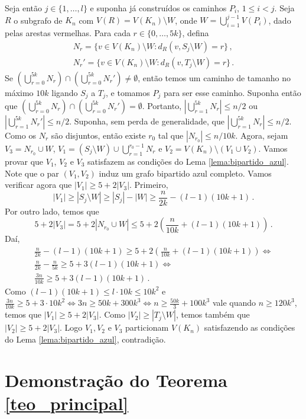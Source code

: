 \begin{dem}
	Seja então $j\in \{1,\dots, l\}$ e suponha já construídos os caminhos $P_i$, $1\leq i<j$. Seja $R$ o subgrafo de $K_n$ com $V(R) = V(K_n)\setminus W$, onde $W = \bigcup_{i=1}^{j-1} V(P_i)$, dado pelas arestas vermelhas. Para cada $r\in\{0,\dots,5k\}$, defina
	\begin{align*}
		N_r = \{v\in V(K_n)\setminus W: d_R(v, S_j\setminus W) = r\} \,,\\
		N_r' = \{v\in V(K_n)\setminus W: d_R(v, T_j\setminus W) = r\}\,.
	\end{align*}
	Se $(\bigcup_{r=0}^{5k}N_r) \cap (\bigcup_{r=0}^{5k}N_r')\neq \emptyset$, então temos um caminho de tamanho no máximo $10k$ ligando $S_j$ a $T_j$, e tomamos $P_j$ para ser esse caminho. Suponha então que $(\bigcup_{r=0}^{5k}N_r)\cap(\bigcup_{r=0}^{5k}N_r') = \emptyset$. Portanto, $|\bigcup_{r=1}^{5k}N_r|\leq n/2$ ou $|\bigcup_{r=1}^{5k}N_r'|\leq n/2$. Suponha, sem perda de generalidade, que $|\bigcup_{r=1}^{5k}N_r|\leq n/2$. Como os $N_r$ são disjuntos, então existe $r_0$ tal que $|N_{r_0}|\leq n/10k$. Agora, sejam $V_3 = N_{r_0}\cup W$, $V_1 = (S_j\setminus W)\cup \bigcup_{r=1}^{r_0-1}N_r$ e $V_2 = V(K_n)\setminus (V_1\cup V_2)$. Vamos provar que $V_1$, $V_2$ e $V_3$ satisfazem as condições do Lema \ref{lema:bipartido_azul}. Note que o par $(V_1, V_2)$ induz um grafo bipartido azul completo. Vamos verificar agora que $|V_1|\geq 5 + 2|V_3|$. Primeiro, 
	\[
		|V_1| \geq |S_j\setminus W| \geq |S_j| - |W| \geq \frac{n}{2k} - (l-1)(10k+1)\,.
	\] 
	Por outro lado, temos que 
	\[
		5 + 2|V_3| = 5 + 2|N_{r_0}\cup W| \leq 5 + 2\left(\frac{n}{10k} + (l-1)(10k+1)\right)\,.
	\]
	Daí, 
	\begin{gather}
		\frac{n}{2k} - (l-1)(10k+1)\geq 5 + 2\left(\frac{n}{10k} + (l-1)(10k+1)\right) \Longleftrightarrow \nonumber\\
		\frac{n}{2k} - \frac{n}{5k} \geq 5 + 3(l-1)(10k+1)\Longleftrightarrow \nonumber\\
		\frac{3n}{10k} \geq 5 + 3(l-1)(10k+1)\,.  \label{eqn1}
 	\end{gather}
	Como $(l-1)(10k+1)\leq l\cdot10k\leq 10k^2$ e $\frac{3n}{10k}\geq 5 + 3\cdot10k^2 \Leftrightarrow 3n\geq 50k + 300k^3\Leftrightarrow n\geq \frac{50k}{3} + 100k^3$ vale quando $n\geq 120k^3$, temos que $|V_1|\geq 5 + 2|V_3|$. Como $|V_2|\geq |T_j\setminus W|$, temos também que $|V_2|\geq 5 + 2|V_3|$. Logo $V_1, V_2$ e $V_3$ particionam $V(K_n)$ satisfazendo as condições do Lema \ref{lema:bipartido_azul}, contradição.
\end{dem}

\section{Demonstração do Teorema \ref{teo_principal}}

